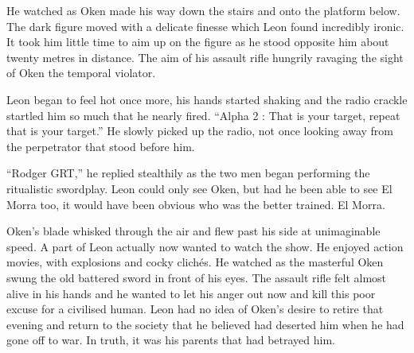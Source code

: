 He watched as Oken made his way down the stairs and onto the platform below.  The dark figure moved with a delicate finesse which Leon found incredibly ironic.  It took him little time to aim up on the figure as he stood opposite him about twenty metres in distance.  The aim of his assault rifle hungrily ravaging the sight of Oken the temporal violator.  

Leon began to feel hot once more, his hands started shaking and the radio crackle startled him so much that he nearly fired.  ``Alpha 2 : That is your target, repeat that is your target.''  He slowly picked up the radio, not once looking away from the perpetrator that stood before him.

``Rodger GRT,'' he replied stealthily as the two men began performing the ritualistic swordplay.  Leon could only see Oken, but had he been able to see El Morra too, it would have been obvious who was the better trained.  El Morra.

Oken's blade whisked through the air and flew past his side at unimaginable speed.  A part of Leon actually now wanted to watch the show.  He enjoyed action movies, with explosions and cocky clichés.  He watched as the masterful Oken swung the old battered sword in front of his eyes.  The assault rifle felt almost alive in his hands and he wanted to let his anger out now and kill this poor excuse for a civilised human.  Leon had no idea of Oken's desire to retire that evening and return to the society that he believed had deserted him when he had gone off to war.  In truth, it was his parents that had betrayed him.




